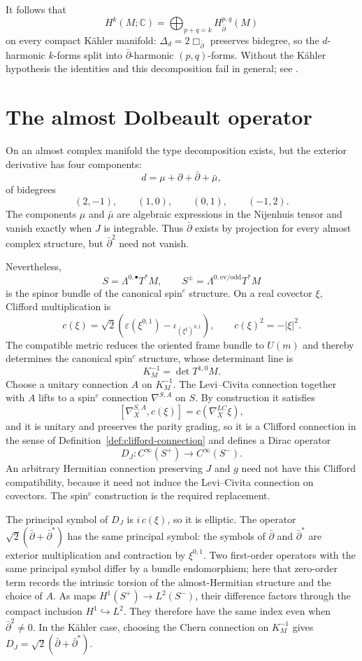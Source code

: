 \documentclass[11pt,oneside,reqno]{book}
\newcommand{\C}{\mathbb C}
\theoremstyle{plain}
\theoremstyle{definition}
\theoremstyle{remark}
\begin{document}
It follows that
\[
 H^k(M;\C)
 =
 \bigoplus_{p+q=k}H^{p,q}_{\bar\partial}(M)
\]
on every compact Kähler manifold: \(\Delta_d=2\Box_{\bar\partial}\)
preserves bidegree, so the \(d\)-harmonic \(k\)-forms split into
\(\bar\partial\)-harmonic \((p,q)\)-forms.  Without the Kähler hypothesis
the identities and this decomposition fail in general; see
\cite[Chapter~V]{Wells}.

\section{The almost Dolbeault operator}

On an almost complex manifold the type decomposition exists, but the
exterior derivative has four components:
\[
 d=\mu+\partial+\bar\partial+\bar\mu,
\]
of bidegrees
\[
 (2,-1),\qquad(1,0),\qquad(0,1),\qquad(-1,2).
\]
The components \(\mu\) and \(\bar\mu\) are algebraic expressions in the
Nijenhuis tensor and vanish exactly when \(J\) is integrable. Thus
\(\bar\partial\) exists by projection for every almost complex structure,
but \(\bar\partial^2\) need not vanish.

Nevertheless,
\[
 S=\Lambda^{0,\bullet}T^*M,\qquad
 S^\pm=\Lambda^{0,\mathrm{ev/odd}}T^*M
\]
is the spinor bundle of the canonical spin\(^{c}\) structure. On a real
covector \(\xi\), Clifford multiplication is
\[
 c(\xi)=\sqrt2\left(
 \varepsilon(\xi^{0,1})
 -\iota_{(\xi^\sharp)^{0,1}}
 \right),
 \qquad c(\xi)^2=-|\xi|^2.
\]
The compatible metric reduces the oriented frame bundle to \(U(m)\) and
thereby determines the canonical spin\(^{c}\) structure, whose determinant
line is
\[
 K_M^{-1}=\det T^{1,0}M.
\]
Choose a unitary connection \(A\) on \(K_M^{-1}\).  The Levi--Civita
connection together with \(A\) lifts to a spin\(^{c}\) connection
\(\nabla^{S,A}\) on \(S\).  By construction it satisfies
\[
 [\nabla_X^{S,A},c(\xi)]
 =c(\nabla_X^{LC}\xi),
\]
and it is unitary and preserves the parity grading, so it is a Clifford
connection in the sense of Definition~\ref{def:clifford-connection} and
defines a Dirac operator
\[
 D_J:C^\infty(S^+)\longrightarrow C^\infty(S^-).
\]
An arbitrary Hermitian connection preserving \(J\) and \(g\) need not have
this Clifford compatibility, because it need not induce the Levi--Civita
connection on covectors.  The spin\(^{c}\) construction is the required
replacement.

The principal symbol of \(D_J\) is \(i\,c(\xi)\), so it is elliptic.  The
operator \(\sqrt2(\bar\partial+\bar\partial^*)\) has the same principal
symbol: the symbols of \(\bar\partial\) and \(\bar\partial^*\) are exterior
multiplication and contraction by \(\xi^{0,1}\).  Two first-order operators
with the same principal symbol differ by a bundle endomorphism; here that
zero-order term records the intrinsic torsion of the almost-Hermitian
structure and the choice of \(A\).  As maps \(H^1(S^+)\to L^2(S^-)\), their
difference factors through the compact inclusion \(H^1\hookrightarrow L^2\).
They therefore have the same index even when \(\bar\partial^2\ne0\).  In the
Kähler case, choosing the Chern connection on \(K_M^{-1}\) gives
\(D_J=\sqrt2(\bar\partial+\bar\partial^*)\).
\end{document}
